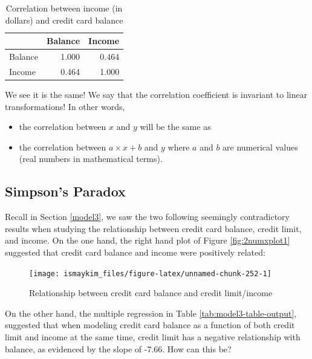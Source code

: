 \documentclass[12pt,]{krantz}
\providecommand{\tightlist}{%
  \setlength{\itemsep}{0pt}\setlength{\parskip}{0pt}}
\theoremstyle{definition}
\theoremstyle{definition}
\theoremstyle{definition}
\theoremstyle{remark}
\begin{document}
\begin{table}[H]

\caption{\label{tab:cor-credit-2}Correlation between income (in dollars) and credit card balance}
\centering
\fontsize{10}{12}\selectfont
\begin{tabular}[t]{lrr}
\toprule
  & Balance & Income\\
\midrule
Balance & 1.000 & 0.464\\
Income & 0.464 & 1.000\\
\bottomrule
\end{tabular}
\end{table}

We see it is the same! We say that the correlation coefficient is
invariant to linear transformations! In other words,

\begin{itemize}
\tightlist
\item
  the correlation between \(x\) and \(y\) will be the same as
\item
  the correlation between \(a\times x + b\) and \(y\) where \(a\) and
  \(b\) are numerical values (real numbers in mathematical terms).
\end{itemize}

\subsection{Simpson's Paradox}\label{simpsonsparadox}

Recall in Section \ref{model3}, we saw the two following seemingly
contradictory results when studying the relationship between credit card
balance, credit limit, and income. On the one hand, the right hand plot
of Figure \ref{fig:2numxplot1} suggested that credit card balance and
income were positively related:

\begin{figure}

{\centering \texttt{[image: ismaykim\_files/figure-latex/unnamed-chunk-252-1]} 

}

\caption{Relationship between credit card balance and credit limit/income}\label{fig:unnamed-chunk-252}
\end{figure}

On the other hand, the multiple regression in Table
\ref{tab:model3-table-output}, suggested that when modeling credit card
balance as a function of both credit limit and income at the same time,
credit limit has a negative relationship with balance, as evidenced by
the slope of -7.66. How can this be?
\end{document}
